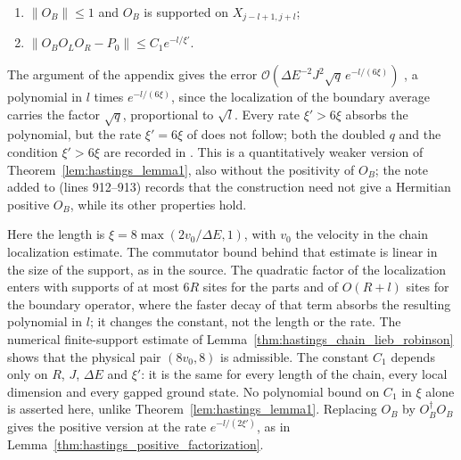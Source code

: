 \begin{lemma}
\begin{enumerate}
        \item $\|O_B\|\le1$ and $O_B$ is supported on $X_{j-l+1,j+l}$;
        \item $\|O_BO_LO_R-P_0\|\le C_1e^{-l/\xi'}$.
    \end{enumerate}
    The argument of the appendix gives the error
    $\mathcal O(\Delta E^{-2}J^2\sqrt q\,e^{-l/(6\xi)})$
    \cite[lines 903--907]{Hastings2007AreaLaw}, a polynomial in $l$ times
    $e^{-l/(6\xi)}$, since the localization of the boundary average carries
    the factor $\sqrt q$, proportional to $\sqrt l$. Every rate $\xi'>6\xi$
    absorbs the polynomial, but the rate $\xi'=6\xi$ of
    \cite[lines 124--144]{Hastings2007AreaLaw} does not follow; both the
    doubled $q$ and the condition $\xi'>6\xi$ are recorded in
    \cite{gap:hastings07_gaussian_average_exponent}. This is a quantitatively
    weaker version of Theorem~\ref{lem:hastings_lemma1}, also without the
    positivity of $O_B$; the note
    added to \cite{Hastings2007AreaLaw} (lines 912--913) records that the
    construction need not give a Hermitian positive $O_B$, while its other
    properties hold.

    Here the length is $\xi=8\max(2v_0/\Delta E,1)$, with $v_0$ the
    velocity in the chain localization estimate. The commutator bound behind
    that estimate is linear in the size of the support, as in the source. The
    quadratic factor of the localization enters with supports of at most $6R$
    sites for the parts and of $O(R+l)$ sites for the boundary operator, where
    the faster decay of that term absorbs the resulting polynomial in $l$; it
    changes the constant, not the length or the rate.
    The numerical finite-support estimate of
    Lemma~\ref{thm:hastings_chain_lieb_robinson} shows that the physical
    pair $(8v_0,8)$ is admissible. The constant $C_1$
    depends only on $R$, $J$, $\Delta E$ and $\xi'$: it is the same for every
    length of the chain, every local dimension and every gapped ground state.
    No polynomial bound on $C_1$ in $\xi$ alone is asserted here, unlike
    Theorem~\ref{lem:hastings_lemma1}.
    Replacing $O_B$ by $O_B^\dagger O_B$ gives the positive version at the rate
    $e^{-l/(2\xi')}$, as in Lemma~\ref{thm:hastings_positive_factorization}.
\end{lemma}

